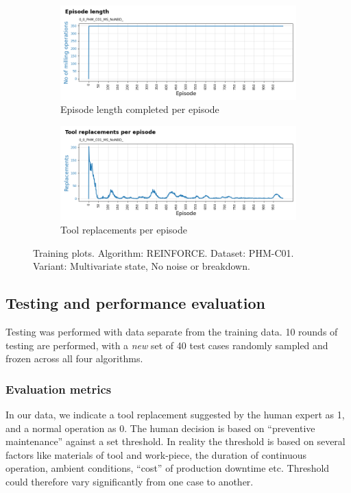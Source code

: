 \documentclass[a4paper, 12pt]{article}
\begin{document}
\begin{figure}[ht]
	\begin{subfigure}[b]{0.5\textwidth}
		\centering
		\includegraphics[width=\textwidth]{images/TrainingPlots/0_0_PHM_C01_MS_NoNBD__Episode_Length.png}  
		\caption{Episode length completed per episode}
		\label{fig:C01eplen}
	\end{subfigure}
	\hfill
	\begin{subfigure}[b]{0.5\textwidth}
		\centering
		\includegraphics[width=\textwidth]{images/TrainingPlots/0_0_PHM_C01_MS_NoNBD__Tool_Replacements.png}  
		\caption{Tool replacements per episode}
		\label{fig:C01toolrep}
	\end{subfigure} 
	\caption{Training plots. Algorithm: REINFORCE. Dataset: PHM-C01. Variant: Multivariate state, No noise or breakdown.}
	\label{fig:C01trplots}
\end{figure}

\subsection{Testing and performance evaluation}
Testing was performed with data separate from the training data. 10 rounds of testing are performed, with a \textit{new} set of 40 test cases randomly sampled and frozen across all four algorithms. 

\subsubsection*{Evaluation metrics}
In our data, we indicate a tool replacement suggested by the human expert as 1, and a normal operation as 0. The human decision is based on ``preventive maintenance'' against a set threshold. In reality the threshold is based on several factors like materials of tool and work-piece, the duration of continuous operation, ambient conditions, ``cost'' of production downtime etc. Threshold could therefore vary significantly from one case to another.
\end{document}
